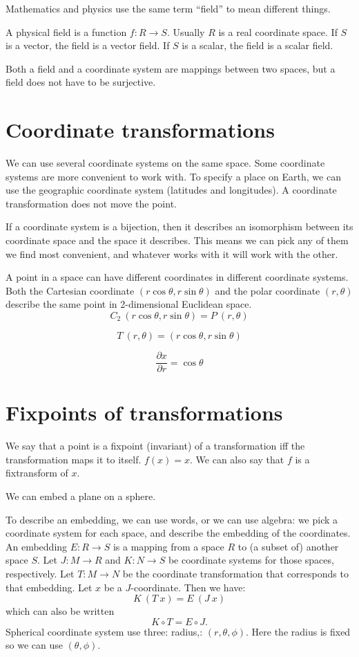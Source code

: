 Mathematics and physics use the same term ``field'' to mean different things.

A physical field is a function $f : R \to S$.
Usually $R$ is a real coordinate space.
If $S$ is a vector, the field is a vector field.
If $S$ is a scalar, the field is a scalar field.

Both a field and a coordinate system are mappings between two spaces,
but a field does not have to be surjective.

\section{Coordinate transformations}

We can use several coordinate systems on the same space.
Some coordinate systems are more convenient to work with.
To specify a place on Earth, we can use the
geographic coordinate system (latitudes and longitudes).
A coordinate transformation does not move the point.

If a coordinate system is a bijection,
then it describes an isomorphism between
its coordinate space and the space it describes.
This means we can pick any of them we find most convenient,
and whatever works with it will work with the other.

A point in a space can have different coordinates in different coordinate systems.
Both the Cartesian coordinate $(r\cos\theta, r\sin\theta)$ and the polar coordinate $(r,\theta)$
describe the same point in 2-dimensional Euclidean space.
\[
C_2~(r\cos\theta, r\sin\theta) = P~(r,\theta)
\]

\[
T~(r,\theta) = (r \cos \theta, r \sin \theta)
\]

\[
\frac{\partial x}{\partial r} = \cos \theta
\]

\section{Fixpoints of transformations}

We say that a point is a fixpoint (invariant)
of a transformation iff the transformation maps it to itself.
$f(x) = x$.
We can also say that $f$ is a fixtransform of $x$.

We can embed a plane on a sphere.

To describe an embedding,
we can use words, or we can use algebra:
we pick a coordinate system for each space,
and describe the embedding of the coordinates.
An embedding $E : R \to S$ is a mapping from a space $R$ to (a subset of) another space $S$.
Let $J : M \to R$ and $K : N \to S$ be coordinate systems for those spaces, respectively.
Let $T : M \to N$ be the coordinate transformation that corresponds to that embedding.
Let $x$ be a $J$-coordinate.
Then we have:
\[
K~(T~x) = E~(J~x)
\]
which can also be written
\[
K \circ T = E \circ J.
\]
Spherical coordinate system
use three: radius,: $(r,\theta,\phi)$. Here the radius is fixed so we can use $(\theta,\phi)$.

